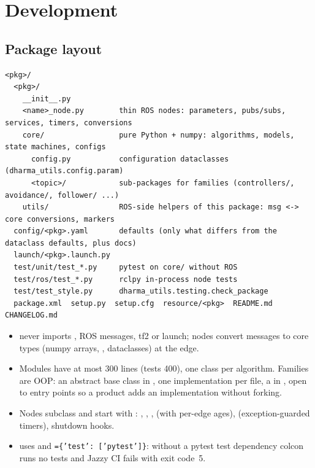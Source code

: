\chapter{Development}
\label{ch:dev}

\section{Package layout}

\begin{lstlisting}
<pkg>/
  <pkg>/
    __init__.py
    <name>_node.py        thin ROS nodes: parameters, pubs/subs, services, timers, conversions
    core/                 pure Python + numpy: algorithms, models, state machines, configs
      config.py           configuration dataclasses (dharma_utils.config.param)
      <topic>/            sub-packages for families (controllers/, avoidance/, follower/ ...)
    utils/                ROS-side helpers of this package: msg <-> core conversions, markers
  config/<pkg>.yaml       defaults (only what differs from the dataclass defaults, plus docs)
  launch/<pkg>.launch.py
  test/unit/test_*.py     pytest on core/ without ROS
  test/ros/test_*.py      rclpy in-process node tests
  test/test_style.py      dharma_utils.testing.check_package
  package.xml  setup.py  setup.cfg  resource/<pkg>  README.md  CHANGELOG.md
\end{lstlisting}

\begin{itemize}
  \item {} never imports , ROS messages, tf2 or launch; nodes convert messages
    to core types (numpy arrays, , dataclasses) at the edge.
  \item Modules have at most 300 lines (tests 400), one class per algorithm. Families are OOP: an
    abstract base class in , one implementation per file, a
     in , open to entry points so a product
    adds an implementation without forking.
  \item Nodes subclass  and start with :
    , , ,  (with per-edge
    ages),  (exception-guarded timers), shutdown hooks.
  \item {} uses  and
    \texttt{=\{'test': ['pytest']\}}: without a pytest test dependency colcon runs no
    tests and Jazzy CI fails with exit code~5.
\end{itemize}

